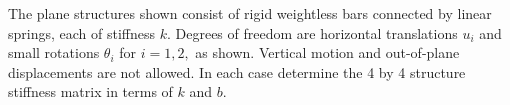 \documentclass[../main.tex]{subfiles}
\begin{document}

 The plane structures shown consist of rigid weightless bars connected by linear springs, each of stiffness $k$.
 Degrees of freedom are horizontal translations \(u_i\) and small rotations \(\theta_i\) for $i = 1, 2,$ as shown.
 Vertical motion and out-of-plane displacements are not allowed.
 In each case determine the 4 by 4 structure stiffness matrix in terms of $k$ and $b$.
\end{document}
